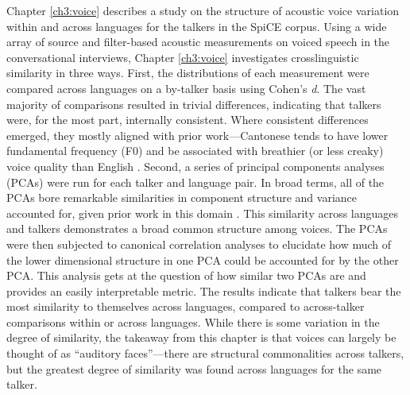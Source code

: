 Chapter \ref{ch3:voice} describes a study on the structure of acoustic voice variation within and across languages for the talkers in the SpiCE corpus. Using a wide array of source and filter-based acoustic measurements on voiced speech in the conversational interviews, Chapter \ref{ch3:voice} investigates crosslinguistic similarity in three ways. First, the distributions of each measurement were compared across languages on a by-talker basis using Cohen's \textit{d}. The vast majority of comparisons resulted in trivial differences, indicating that talkers were, for the most part, internally consistent. Where consistent differences emerged, they mostly aligned with prior work---Cantonese tends to have lower fundamental frequency (F0) and be associated with breathier (or less creaky) voice quality than English \citep[cf.][]{ng_2012_ltas}. Second, a series of principal components analyses (PCAs) were run for each talker and language pair. 
In broad terms, all of the PCAs bore remarkable similarities in component structure and variance accounted for, given prior work in this domain \citep{lee_2019_acoustic, lee_2019_spontaneous, lee_2020_language}. This similarity across languages and talkers demonstrates a broad common structure among voices. The PCAs were then subjected to canonical correlation analyses to elucidate how much of the lower dimensional structure in one PCA could be accounted for by the other PCA. This analysis gets at the question of how similar two PCAs are and provides an easily interpretable metric. The results indicate that talkers bear the most similarity to themselves across languages, compared to across-talker comparisons within or across languages. While there is some variation in the degree of similarity, the takeaway from this chapter is that voices can largely be thought of as ``auditory faces''---there are structural commonalities across talkers, but the greatest degree of similarity was found across languages for the same talker. 

